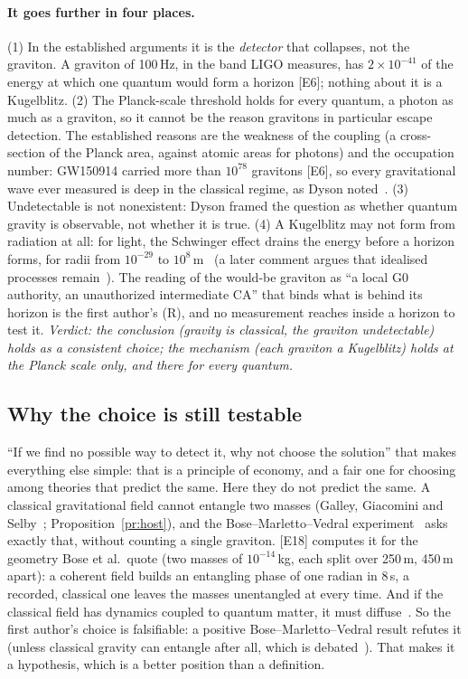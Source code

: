 \documentclass[11pt,a4paper]{article}
\theoremstyle{definition}
\theoremstyle{remark}
\newcommand{\chk}[1]{\textsf{[#1]}}
\newcommand{\tagR}{\textsf{(R)}}
\begin{document}
\paragraph{It goes further in four places.} (1) In the established arguments it is the \emph{detector} that collapses, not the graviton.
A graviton of 100\,Hz, in the band LIGO measures, has $2\times10^{-41}$ of the energy at which one quantum would form a horizon
\chk{E6}; nothing about it is a Kugelblitz. (2) The Planck-scale threshold holds for every quantum, a photon as much as a graviton, so it
cannot be the reason gravitons in particular escape detection. The established reasons are the weakness of the coupling (a cross-section
of the Planck area, against atomic areas for photons) and the occupation number: GW150914 carried more than $10^{78}$ gravitons
\chk{E6}, so every gravitational wave ever measured is deep in the classical regime, as Dyson noted~\cite{dyson}. (3) Undetectable is not
nonexistent: Dyson framed the question as whether quantum gravity is observable, not whether it is true. (4) A Kugelblitz may not form
from radiation at all: for light, the Schwinger effect drains the energy before a horizon forms, for radii from $10^{-29}$ to
$10^{8}$\,m~\cite{nobh} (a later comment argues that idealised processes remain~\cite{pagecomment}). The reading of the would-be graviton
as ``a local G0 authority, an unauthorized intermediate CA'' that binds what is behind its horizon is the first author's \tagR, and no
measurement reaches inside a horizon to test it. \emph{Verdict: the conclusion (gravity is classical, the graviton undetectable) holds as
a consistent choice; the mechanism (each graviton a Kugelblitz) holds at the Planck scale only, and there for every quantum.}

\subsection{Why the choice is still testable}

``If we find no possible way to detect it, why not choose the solution'' that makes everything else simple: that is a principle of
economy, and a fair one for choosing among theories that predict the same. Here they do not predict the same. A classical gravitational
field cannot entangle two masses (Galley, Giacomini and Selby~\cite{ggs}; Proposition~\ref{pr:host}), and the Bose--Marletto--Vedral
experiment~\cite{bose,mv} asks exactly that, without counting a single graviton. \chk{E18} computes it for the geometry Bose et al.\ quote
(two masses of $10^{-14}$\,kg, each split over 250\,\textmu m, 450\,\textmu m apart): a coherent field builds an entangling phase of one
radian in 8\,s, a recorded, classical one leaves the masses unentangled at every time. And if the classical
field has dynamics coupled to quantum matter, it must diffuse~\cite{osswd}. So the first author's choice is falsifiable: a positive
Bose--Marletto--Vedral result refutes it (unless classical gravity can entangle after all, which is debated~\cite{azizhowl,movw}). That
makes it a hypothesis, which is a better position than a definition.
\end{document}
